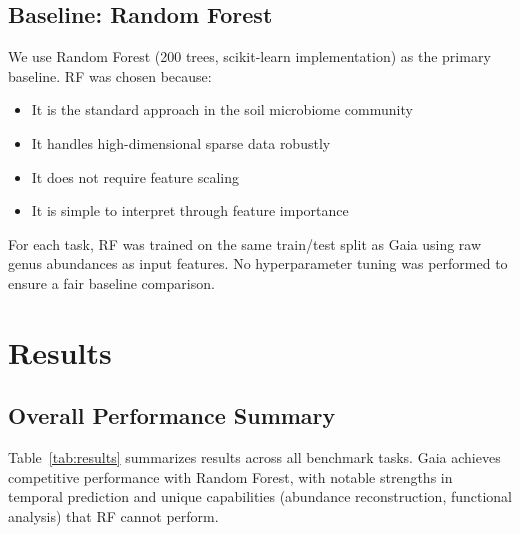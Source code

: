 \documentclass[11pt,a4paper]{article}
\begin{document}
\subsection{Baseline: Random Forest}

We use Random Forest (200 trees, scikit-learn implementation) as the primary baseline. RF was chosen because:

\begin{itemize}[leftmargin=1.5em]
    \item It is the standard approach in the soil microbiome community
    \item It handles high-dimensional sparse data robustly
    \item It does not require feature scaling
    \item It is simple to interpret through feature importance
\end{itemize}

For each task, RF was trained on the same train/test split as Gaia using raw genus abundances as input features. No hyperparameter tuning was performed to ensure a fair baseline comparison.

\section{Results}

\subsection{Overall Performance Summary}

Table~\ref{tab:results} summarizes results across all benchmark tasks. Gaia achieves competitive performance with Random Forest, with notable strengths in temporal prediction and unique capabilities (abundance reconstruction, functional analysis) that RF cannot perform.
\end{document}

